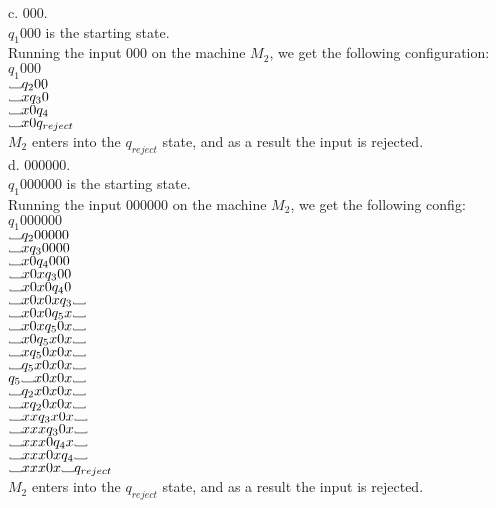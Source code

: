 \documentclass[12pt]{article}
\newcommand\Vtextvisiblespace[1][.8em]{%
	\mbox{\kern.07em\vrule height.3ex}%
	\vbox{\hrule width#1}%
	\hbox{\vrule height.3ex}}
\begin{document}
\pagebreak
c. 000. \\
$q_1 000$ is the starting state. \\
Running the input 000 on the machine $M_2$, we get the following configuration: \\

$q_1 000$ \\
$\Vtextvisiblespace q_2 00$ \\
$\Vtextvisiblespace x q_3 0$ \\
$\Vtextvisiblespace x0 q_4 $ \\
$\Vtextvisiblespace x0 q_{reject} $ \\
$M_2$ enters into the $q_{reject}$ state, and as a result the input is rejected. \\

d. 000000. \\
$q_1 000000$ is the starting state. \\
Running the input 000000 on the machine $M_2$, we get the following config: \\

$q_1 000000$ \\
$\Vtextvisiblespace       q_2 00000 $  \\
$\Vtextvisiblespace x     q_3 0000 $ \\
$\Vtextvisiblespace x0    q_4 000 $ \\
$\Vtextvisiblespace x0x   q_3 00 $ \\
$\Vtextvisiblespace x0x0  q_4 0 $ \\
$\Vtextvisiblespace x0x0x q_3 \Vtextvisiblespace $ \\
$\Vtextvisiblespace x0x0  q_5 x \Vtextvisiblespace $ \\
$\Vtextvisiblespace x0x   q_5 0x \Vtextvisiblespace $ \\
$\Vtextvisiblespace x0    q_5 x0x \Vtextvisiblespace $ \\
$\Vtextvisiblespace x     q_5 0x0x \Vtextvisiblespace $ \\
$\Vtextvisiblespace       q_5 x0x0x \Vtextvisiblespace $ \\
$q_5 \Vtextvisiblespace x0x0x \Vtextvisiblespace $ \\
$\Vtextvisiblespace       q_2 x0x0x \Vtextvisiblespace $ \\
$\Vtextvisiblespace x     q_2 0x0x \Vtextvisiblespace $ \\
$\Vtextvisiblespace xx    q_3 x0x \Vtextvisiblespace $ \\
$\Vtextvisiblespace xxx   q_3 0x \Vtextvisiblespace $ \\
$\Vtextvisiblespace xxx0  q_4 x \Vtextvisiblespace $ \\
$\Vtextvisiblespace xxx0x q_4  \Vtextvisiblespace $ \\
$\Vtextvisiblespace xxx0x \Vtextvisiblespace q_{reject} $ \\
$M_2$ enters into the $q_{reject}$ state, and as a result the input is rejected. \\
\end{document}
